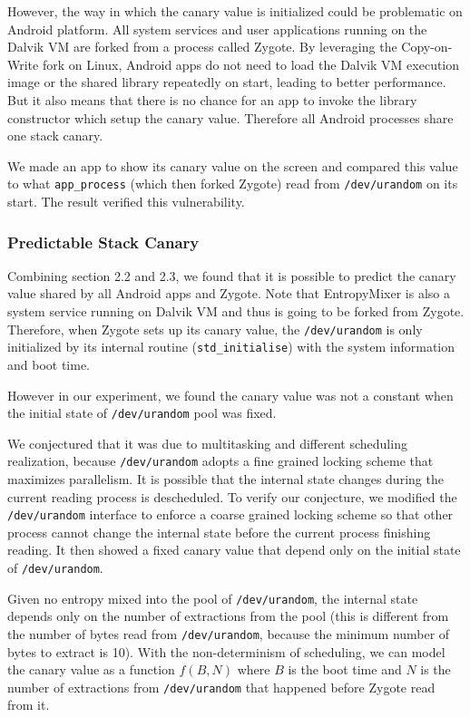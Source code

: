 However, the way in which the canary value is initialized could be problematic on Android platform. All system services and user applications running on the Dalvik VM are forked from a process called Zygote. By leveraging the Copy-on-Write fork on Linux, Android apps do not need to load the Dalvik VM execution image or the shared library repeatedly on start, leading to better performance. But it also means that there is no chance for an app to invoke the library constructor which setup the canary value. Therefore all Android processes share one stack canary.

We made an app \cite{jnioverflow} to show its canary value on the screen and compared this value to what \verb|app_process| (which then forked Zygote) read from \verb|/dev/urandom| on its start. The result verified this vulnerability. 

\subsubsection{Predictable Stack Canary}

Combining section 2.2 and 2.3, we found that it is possible to predict the canary value shared by all Android apps and Zygote. Note that EntropyMixer is also a system service running on Dalvik VM and thus is going to be forked from Zygote. Therefore, when Zygote sets up its canary value, the \verb|/dev/urandom| is only initialized by its internal routine (\verb|std_initialise|)  with the system information and boot time.

However in our experiment, we found the canary value was not a constant when the initial state of \verb|/dev/urandom| pool was fixed. 

We conjectured that it was due to multitasking and different scheduling realization, because \verb|/dev/urandom| adopts a fine grained locking scheme that maximizes parallelism. It is possible that the internal state changes during the current reading process is descheduled. To verify our conjecture, we modified the \verb|/dev/urandom| interface to enforce a coarse grained locking scheme so that other process cannot change the internal state before the current process finishing reading. It then showed a fixed canary value that depend only on the initial state of \verb|/dev/urandom|.

Given no entropy mixed into the pool of \verb|/dev/urandom|, the internal state depends only on the number of extractions from the pool (this is different from the number of bytes read from \verb|/dev/urandom|, because the minimum number of bytes to extract is 10). With the non-determinism of scheduling, we can model the canary value as a function $f(B,N)$ where $B$ is the boot time and $N$ is the number of extractions from \verb|/dev/urandom| that happened before Zygote read from it.


